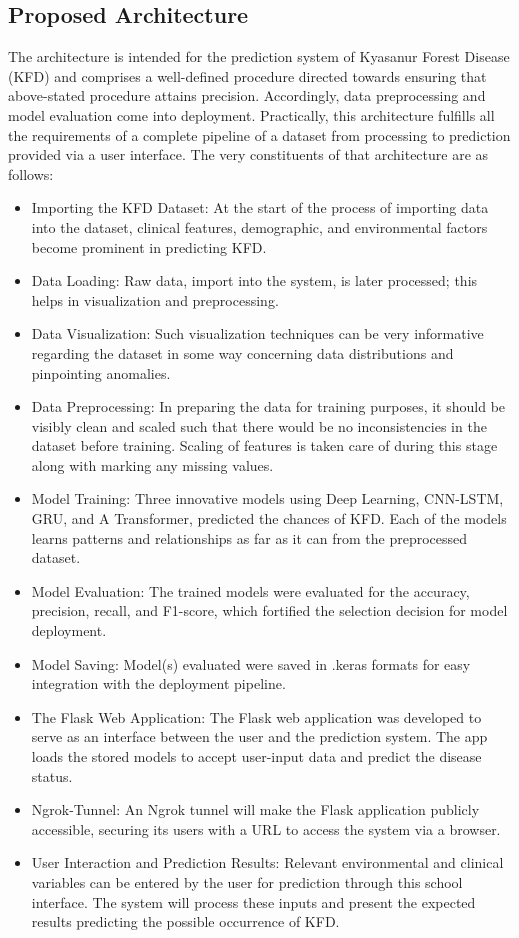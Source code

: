 \documentclass[conference]{IEEEtran}
\begin{document}
\subsection{Proposed Architecture}\label{SCM}
The architecture is intended for the prediction system of Kyasanur Forest Disease (KFD) and comprises a well-defined procedure directed towards ensuring that above-stated procedure attains precision. Accordingly, data preprocessing and model evaluation come into deployment. Practically, this architecture fulfills all the requirements of a complete pipeline of a dataset from processing to prediction provided via a user interface. The very constituents of that architecture are as follows:
\begin{itemize}
    \item Importing the KFD Dataset: 
At the start of the process of importing data into the dataset, clinical features, demographic, and environmental factors become prominent in predicting KFD.
    \item Data Loading: 
Raw data, import into the system, is later processed; this helps in visualization and preprocessing.
    \item Data Visualization: 
Such visualization techniques can be very informative regarding the dataset in some way concerning data distributions and pinpointing anomalies.
    \item Data Preprocessing: 
In preparing the data for training purposes, it should be visibly clean and scaled such that there would be no inconsistencies in the dataset before training. Scaling of features is taken care of during this stage along with marking any missing values.
    \item Model Training: 
Three innovative models using Deep Learning, CNN-LSTM, GRU, and A Transformer, predicted the chances of KFD. Each of the models learns patterns and relationships as far as it can from the preprocessed dataset. 
    \item Model Evaluation: 
The trained models were evaluated for the accuracy, precision, recall, and F1-score, which fortified the selection decision for model deployment. 
    \item Model Saving: 
Model(s) evaluated were saved in .keras formats for easy integration with the deployment pipeline. 
    \item The Flask Web Application: 
The Flask web application was developed to serve as an interface between the user and the prediction system. The app loads the stored models to accept user-input data and predict the disease status. 
    \item Ngrok-Tunnel: 
An Ngrok tunnel will make the Flask application publicly accessible, securing its users with a URL to access the system via a browser. 
    \item User Interaction and Prediction Results: 
Relevant environmental and clinical variables can be entered by the user for prediction through this school interface. The system will process these inputs and present the expected results predicting the possible occurrence of KFD. 
\end{itemize}
\end{document}
